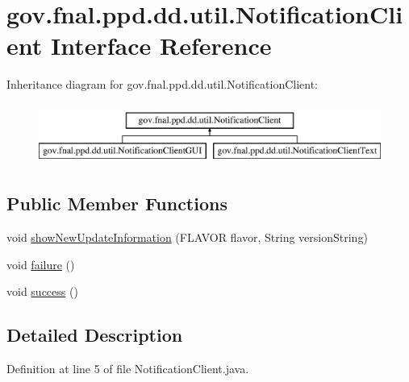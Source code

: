 \hypertarget{interfacegov_1_1fnal_1_1ppd_1_1dd_1_1util_1_1NotificationClient}{\section{gov.\-fnal.\-ppd.\-dd.\-util.\-Notification\-Client Interface Reference}
\label{interfacegov_1_1fnal_1_1ppd_1_1dd_1_1util_1_1NotificationClient}
}
Inheritance diagram for gov.\-fnal.\-ppd.\-dd.\-util.\-Notification\-Client\-:\begin{figure}[H]
\begin{center}
\leavevmode
\includegraphics[height=2.000000cm]{interfacegov_1_1fnal_1_1ppd_1_1dd_1_1util_1_1NotificationClient}
\end{center}
\end{figure}
\subsection*{Public Member Functions}
\begin{DoxyCompactItemize}
\item 
void \hyperlink{interfacegov_1_1fnal_1_1ppd_1_1dd_1_1util_1_1NotificationClient_ad60ec28400496066ca3e3fd07245f2b7}{show\-New\-Update\-Information} (F\-L\-A\-V\-O\-R flavor, String version\-String)
\item 
void \hyperlink{interfacegov_1_1fnal_1_1ppd_1_1dd_1_1util_1_1NotificationClient_a098fe6b3d1b1f9e44fe616b3fab6ef21}{failure} ()
\item 
void \hyperlink{interfacegov_1_1fnal_1_1ppd_1_1dd_1_1util_1_1NotificationClient_a9958abd14c8e1b50015a07944a139051}{success} ()
\end{DoxyCompactItemize}


\subsection{Detailed Description}


Definition at line 5 of file Notification\-Client.\-java.



